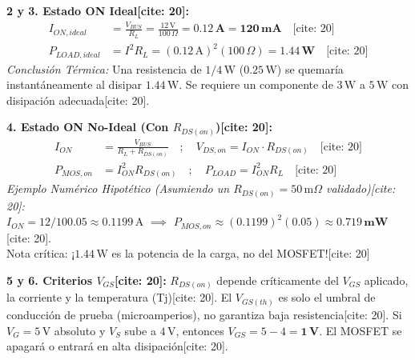 \documentclass[11pt, a4paper]{article}
\begin{document}
\vspace{0.4cm}
\textbf{2 y 3. Estado ON Ideal[cite: 20]:}
\begin{align*}
    I_{ON,ideal} &= \frac{V_{BUS}}{R_L} = \frac{12\,\text{V}}{100\,\Omega} = \mathbf{0.12\,\text{A} = 120\,\text{mA}} \quad \text{[cite: 20]} \\
    P_{LOAD,ideal} &= I^2 R_L = (0.12\,\text{A})^2 (100\,\Omega) = \mathbf{1.44\,\text{W}} \quad \text{[cite: 20]}
\end{align*}
\textit{Conclusión Térmica:} Una resistencia de $1/4\,\text{W}$ ($0.25\,\text{W}$) se quemaría instantáneamente al disipar $1.44\,\text{W}$. Se requiere un componente de $3\,\text{W}$ a $5\,\text{W}$ con disipación adecuada[cite: 20].

\vspace{0.4cm}
\textbf{4. Estado ON No-Ideal (Con $R_{DS(on)}$)[cite: 20]:}
\begin{align*}
    I_{ON} &= \frac{V_{BUS}}{R_L + R_{DS(on)}} \quad ; \quad V_{DS,on} = I_{ON} \cdot R_{DS(on)} \quad \text{[cite: 20]} \\
    P_{MOS,on} &= I_{ON}^2 R_{DS(on)} \quad ; \quad P_{LOAD} = I_{ON}^2 R_L \quad \text{[cite: 20]}
\end{align*}
\textit{Ejemplo Numérico Hipotético (Asumiendo un $R_{DS(on)} = 50\,\text{m}\Omega$ validado)[cite: 20]:} \\
$I_{ON} = 12 / 100.05 \approx 0.1199\,\text{A}$ $\implies$ $P_{MOS,on} \approx (0.1199)^2 (0.05) \approx \mathbf{0.719\,\text{mW}}$[cite: 20]. \\
Nota crítica: ¡$1.44\,\text{W}$ es la potencia de la carga, no del MOSFET![cite: 20]

\vspace{0.4cm}
\textbf{5 y 6. Criterios $V_{GS}$[cite: 20]:}
$R_{DS(on)}$ depende críticamente del $V_{GS}$ aplicado, la corriente y la temperatura (Tj)[cite: 20]. El $V_{GS(th)}$ es solo el umbral de conducción de prueba (microamperios), no garantiza baja resistencia[cite: 20].
Si $V_G = 5\,\text{V}$ absoluto y $V_S$ sube a $4\,\text{V}$, entonces $V_{GS} = 5 - 4 = \mathbf{1\,\text{V}}$. El MOSFET se apagará o entrará en alta disipación[cite: 20].
\end{document}
